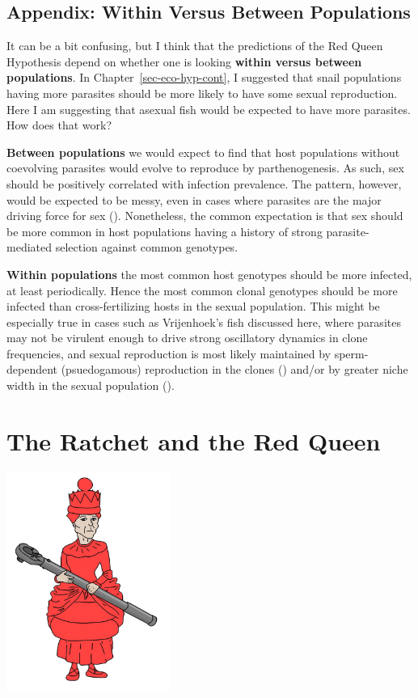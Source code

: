 \documentclass[
  letterpaper,
]{book}
\begin{document}
\section{Appendix: Within Versus Between Populations}\label{sec-app-5}

It can be a bit confusing, but I think that the predictions of the Red
Queen Hypothesis depend on whether one is looking \textbf{within versus
between populations}. In Chapter~\ref{sec-eco-hyp-cont}, I suggested
that snail populations having more parasites should be more likely to
have some sexual reproduction. Here I am suggesting that asexual fish
would be expected to have more parasites. How does that work?

\textbf{Between populations} we would expect to find that host
populations without coevolving parasites would evolve to reproduce by
parthenogenesis. As such, sex should be positively correlated with
infection prevalence. The pattern, however, would be expected to be
messy, even in cases where parasites are the major driving force for sex
(). Nonetheless,
the common expectation is that sex should be more common in host
populations having a history of strong parasite-mediated selection
against common genotypes.

\textbf{Within populations} the most common host genotypes should be
more infected, at least periodically. Hence the most common clonal
genotypes should be more infected than cross-fertilizing hosts in the
sexual population. This might be especially true in cases such as
Vrijenhoek's fish discussed here, where parasites may not be virulent
enough to drive strong oscillatory dynamics in clone frequencies, and
sexual reproduction is most likely maintained by sperm-dependent
(psuedogamous) reproduction in the clones
() and/or by greater niche
width in the sexual population ().


\chapter{The Ratchet and the Red Queen}\label{sec-chap6}

\begin{center}
\includegraphics[width=0.4\textwidth,height=\textheight]{images/fig6-1.jpeg}
\end{center}
\end{document}

